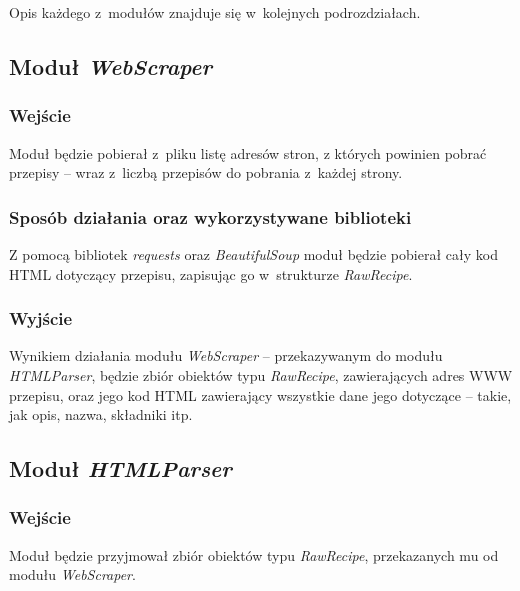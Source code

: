 \documentclass[11pt,a4paper]{article}
\begin{document}

Opis każdego z~modułów znajduje się w~kolejnych podrozdziałach.

\subsection{Moduł \textit{WebScraper}}
\subsubsection{Wejście}
Moduł będzie pobierał z~pliku listę adresów stron, z których powinien pobrać przepisy -- wraz z~liczbą przepisów do pobrania z~każdej strony.
\subsubsection{Sposób działania oraz wykorzystywane biblioteki}
Z pomocą bibliotek \textit{requests} oraz \textit{BeautifulSoup} moduł będzie pobierał cały kod HTML dotyczący przepisu, zapisując go w~strukturze \textit{RawRecipe}.
\subsubsection{Wyjście}
Wynikiem działania modułu \textit{WebScraper} -- przekazywanym do modułu \textit{HTMLParser}, będzie zbiór obiektów typu \textit{RawRecipe}, zawierających adres WWW przepisu, oraz jego kod HTML zawierający wszystkie dane jego dotyczące -- takie, jak opis, nazwa, składniki itp.

\subsection{Moduł \textit{HTMLParser}}
\subsubsection{Wejście}
Moduł będzie przyjmował zbiór obiektów typu \textit{RawRecipe}, przekazanych mu od modułu \textit{WebScraper}.
\end{document}

